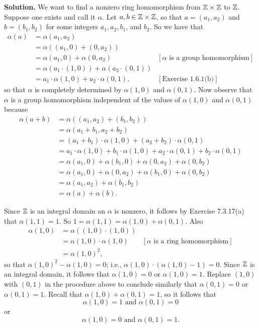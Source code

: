 \begin{enumerate}
      \textbf{Solution.} We want to find a nonzero ring homomorphism from
      $\mathbb{Z}\times\mathbb{Z}$ to $\mathbb{Z}$. Suppose one exists and call it $\alpha$. Let
      $a, b \in \mathbb{Z}\times\mathbb{Z}$, so that $a = (a_1, a_2)$ and $b = (b_1, b_2)$ for
      some integers $a_1, a_2, b_1$, and $b_2$. So we have that
      \begin{align*}
         \alpha(a) &= \alpha(a_1, a_2) \\
            &= \alpha((a_1, 0) + (0, a_2)) \\
            &= \alpha(a_1, 0) + \alpha(0, a_2) &[\alpha
                  \text{ is a group homomorphism}] \\
            &= \alpha(a_1 \cdot( 1, 0)) + \alpha(a_2 \cdot (0, 1))  \\
            &= a_1 \cdot \alpha(1, 0) + a_2 \cdot \alpha(0, 1),
                  &[\text{Exercise 1.6.1(b)}]
      \end{align*}
      so that $\alpha$ is completely determined by $\alpha(1, 0)$ and
      $\alpha(0, 1)$. Now observe that $\alpha$ is a group homomorphism
      independent of the values of $\alpha(1, 0)$ and $\alpha(0, 1)$ because
      \begin{align*}
         \alpha(a + b) &= \alpha((a_1, a_2) + (b_1, b_2)) \\
            &= \alpha(a_1 + b_1, a_2 + b_2) \\
            &= (a_1 + b_1) \cdot \alpha(1, 0) + (a_2 + b_2) \cdot\alpha(0, 1) \\
            &= a_1 \cdot \alpha(1, 0) + b_1 \cdot \alpha(1, 0) +
               a_2 \cdot \alpha(0, 1) + b_2 \cdot \alpha(0, 1) \\
            &= \alpha(a_1, 0) +\alpha(b_1, 0) +\alpha(0, a_2) +\alpha(0, b_2) \\
            &= \alpha(a_1, 0) +\alpha(0, a_2) +\alpha(b_1, 0) +\alpha(0, b_2) \\
            &= \alpha(a_1, a_2) + \alpha(b_1, b_2) \\
            &= \alpha(a) + \alpha(b).
      \end{align*}
   
      Since $\mathbb{Z}$ is an integral domain an $\alpha$ is nonzero, it follows by
      Exercise 7.3.17(a) that $\alpha(1, 1) = 1$. So
      $1 = \alpha(1, 1) = \alpha(1, 0) + \alpha(0, 1)$. Also
      \begin{align*}
         \alpha(1, 0) &= \alpha((1, 0) \cdot (1, 0)) \\
            &= \alpha(1, 0) \cdot \alpha(1, 0)
                  &[\alpha \text{ is a ring homomorphism}] \\
            &= \alpha(1, 0)^2,
      \end{align*}
      so that $\alpha(1, 0)^2 - \alpha(1, 0) = 0$; i.e.,
      $\alpha(1, 0) \cdot (\alpha(1, 0) - 1) = 0$. Since $\mathbb{Z}$ is an integral
      domain, it follows that $\alpha(1, 0) = 0$ or $\alpha(1, 0) = 1$.
      Replace $(1, 0)$ with $(0, 1)$ in the procedure above to conclude
      similarly that  $\alpha(0, 1) = 0$ or $\alpha(0, 1) = 1$. Recall that
      $\alpha(1, 0) + \alpha(0, 1) = 1$, so it follows that
      $$\alpha(1, 0) = 1 \text{ and } \alpha(0, 1) = 0$$
      or
      $$\alpha(1, 0) = 0 \text{ and } \alpha(0, 1) = 1.$$


\end{enumerate}
